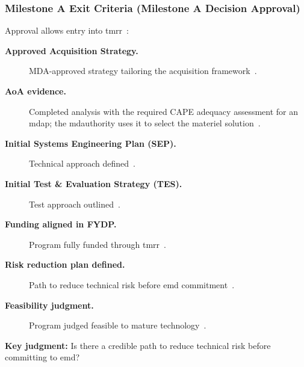 \documentclass[../main.tex]{subfiles}
\begin{document}
\subsubsection{Milestone A Exit Criteria (Milestone A Decision Approval)}
Approval allows entry into \ac{tmrr}~\autocite{DoDI5000-85,edo-3-3-2-acq-milestones-phases-2025}:
\begin{description}
  \item[\textbf{Approved Acquisition Strategy.}] MDA-approved strategy tailoring the acquisition framework~\autocite{edo-3-3-2-acq-milestones-phases-2025}.
  \item[\textbf{AoA evidence.}] Completed analysis with the required CAPE adequacy assessment for an \ac{mdap}; the \ac{mdauthority} uses it to select the materiel solution~\autocite{DoDI5000-84,DoDI5000-85}.
  \item[\textbf{Initial Systems Engineering Plan (SEP).}] Technical approach defined~\autocite{edo-3-3-2-acq-milestones-phases-2025}.
  \item[\textbf{Initial Test \& Evaluation Strategy (TES).}] Test approach outlined~\autocite{edo-3-3-2-acq-milestones-phases-2025}.
  \item[\textbf{Funding aligned in FYDP.}] Program fully funded through \ac{tmrr}~\autocite{edo-3-3-2-acq-milestones-phases-2025}.
  \item[\textbf{Risk reduction plan defined.}] Path to reduce technical risk before \ac{emd} commitment~\autocite{edo-3-3-2-acq-milestones-phases-2025}.
  \item[\textbf{Feasibility judgment.}] Program judged feasible to mature technology~\autocite{edo-3-3-2-acq-milestones-phases-2025}.
\end{description}
\textbf{Key judgment:} Is there a credible path to reduce technical risk before committing to \ac{emd}?~\autocite{DoDI5000-85,edo-3-3-2-acq-milestones-phases-2025}
\end{document}
